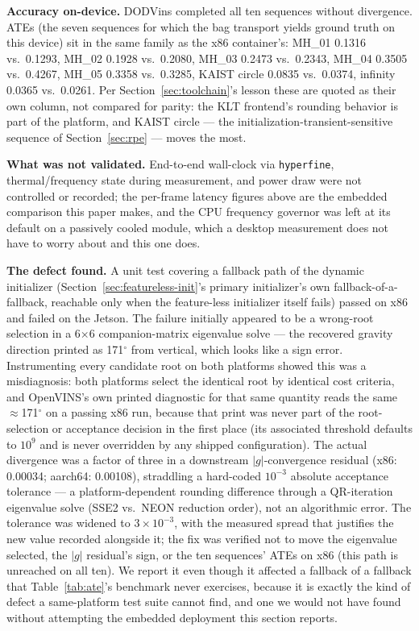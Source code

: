 \documentclass[10pt,conference,letterpaper]{IEEEtran}
\begin{document}
\textbf{Accuracy on-device.} DODVins completed all ten sequences
without divergence. ATEs (the seven sequences for which the bag transport
yields ground truth on this device) sit in the same family as the x86
container's: MH\_01 0.1316 vs.\ 0.1293, MH\_02 0.1928 vs.\ 0.2080, MH\_03
0.2473 vs.\ 0.2343, MH\_04 0.3505 vs.\ 0.4267, MH\_05 0.3358 vs.\ 0.3285,
KAIST circle 0.0835 vs.\ 0.0374, infinity 0.0365 vs.\ 0.0261. Per
Section~\ref{sec:toolchain}'s lesson these are quoted as their own column,
not compared for parity: the KLT frontend's rounding behavior is part of the
platform, and KAIST circle --- the initialization-transient-sensitive
sequence of Section~\ref{sec:rpe} --- moves the most.

\textbf{What was not validated.} End-to-end wall-clock via
\texttt{hyperfine}, thermal/frequency state during measurement, and power
draw were not controlled or recorded; the per-frame latency figures above
are the embedded comparison this paper makes, and the CPU frequency governor
was left at its default on a passively cooled module, which a desktop
measurement does not have to worry about and this one does.

\textbf{The defect found.} A unit test covering a fallback path of the
dynamic initializer (Section~\ref{sec:featureless-init}'s primary
initializer's own fallback-of-a-fallback, reachable only when the
feature-less initializer itself fails) passed on x86 and failed on the
Jetson. The failure initially appeared to be a wrong-root selection in a
6$\times$6 companion-matrix eigenvalue solve --- the recovered gravity
direction printed as 171$^\circ$ from vertical, which looks like a sign
error. Instrumenting every candidate root on both platforms showed this was
a misdiagnosis: both platforms select the identical root by identical cost
criteria, and OpenVINS's own printed diagnostic for that same quantity reads
the same $\approx$171$^\circ$ on a passing x86 run, because that print was
never part of the root-selection or acceptance decision in the first place
(its associated threshold defaults to $10^9$ and is never overridden by any
shipped configuration). The actual divergence was a factor of three in a
downstream $|g|$-convergence residual (x86: 0.00034; aarch64: 0.00108),
straddling a hard-coded $10^{-3}$ absolute acceptance tolerance --- a
platform-dependent rounding difference through a QR-iteration eigenvalue
solve (SSE2 vs.\ NEON reduction order), not an algorithmic error. The
tolerance was widened to $3\times10^{-3}$, with the measured spread that
justifies the new value recorded alongside it; the fix was verified not to
move the eigenvalue selected, the $|g|$ residual's sign, or the ten
sequences' ATEs on x86 (this path is unreached on all ten). We report it
even though it affected a fallback of a fallback that
Table~\ref{tab:ate}'s benchmark never exercises, because it is
exactly the kind of defect a same-platform test suite cannot find, and one
we would not have found without attempting the embedded deployment this
section reports.
\end{document}
